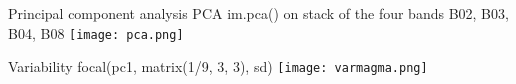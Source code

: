 \documentclass{beamer}
\begin{document}
\begin{frame}{Principal component analysis PCA}
    im.pca() on stack of the four bands B02, B03, B04, B08
    \centering
    \texttt{[image: pca.png]} 
\end{frame}

\begin{frame}{Variability}
    focal(pc1, matrix(1/9, 3, 3), sd)
    \centering
    \bigskip
    \texttt{[image: varmagma.png]}   
\end{frame}
\end{document}
